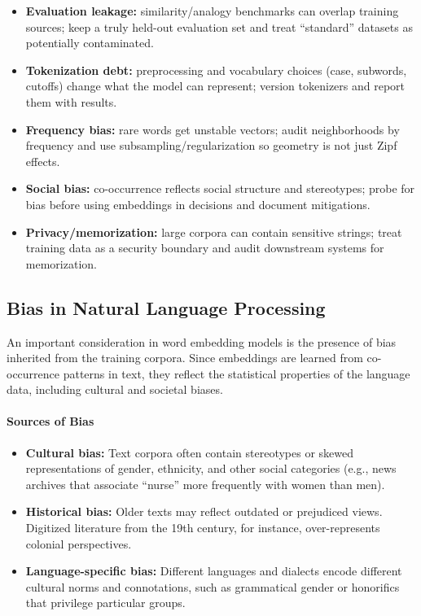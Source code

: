 \begin{tcolorbox}[summarybox, title={Risk \& audit}]
\begin{itemize}
    \item \textbf{Evaluation leakage:} similarity/analogy benchmarks can overlap training sources; keep a truly held-out evaluation set and treat ``standard'' datasets as potentially contaminated.
    \item \textbf{Tokenization debt:} preprocessing and vocabulary choices (case, subwords, cutoffs) change what the model can represent; version tokenizers and report them with results.
    \item \textbf{Frequency bias:} rare words get unstable vectors; audit neighborhoods by frequency and use subsampling/regularization so geometry is not just Zipf effects.
    \item \textbf{Social bias:} co-occurrence reflects social structure and stereotypes; probe for bias before using embeddings in decisions and document mitigations.
    \item \textbf{Privacy/memorization:} large corpora can contain sensitive strings; treat training data as a security boundary and audit downstream systems for memorization.
\end{itemize}
\end{tcolorbox}

\subsection{Bias in Natural Language Processing}
\label{sec:nlp_bias_in_natural_language_processing}

An important consideration in word embedding models is the presence of bias inherited from the training corpora. Since embeddings are learned from co-occurrence patterns in text, they reflect the statistical properties of the language data, including cultural and societal biases.

\paragraph{Sources of Bias}

\begin{itemize}
    \item \textbf{Cultural bias:} Text corpora often contain stereotypes or skewed representations of gender, ethnicity, and other social categories (e.g., news archives that associate ``nurse'' more frequently with women than men).
    \item \textbf{Historical bias:} Older texts may reflect outdated or prejudiced views. Digitized literature from the 19th century, for instance, over-represents colonial perspectives.
    \item \textbf{Language-specific bias:} Different languages and dialects encode different cultural norms and connotations, such as grammatical gender or honorifics that privilege particular groups.
\end{itemize}

